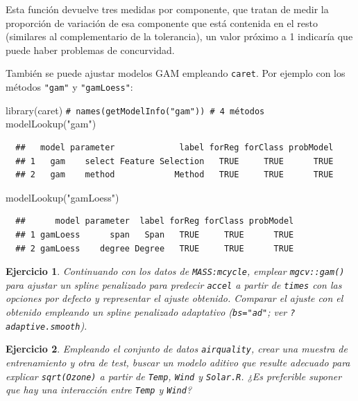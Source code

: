 \documentclass[
]{book}
\newenvironment{Shaded}{\begin{snugshade}}{\end{snugshade}}
\newcommand{\CommentTok}[1]{\textcolor[rgb]{0.56,0.35,0.01}{\textit{#1}}}
\newcommand{\FunctionTok}[1]{\textcolor[rgb]{0.00,0.00,0.00}{#1}}
\newcommand{\NormalTok}[1]{#1}
\newcommand{\StringTok}[1]{\textcolor[rgb]{0.31,0.60,0.02}{#1}}
\theoremstyle{break}
\newtheorem{exercise}{Ejercicio}[chapter]
\theoremstyle{nonumberplain}
\renewcommand{\CommentTok}[1]{\textcolor[rgb]{0.41,0.41,0.41}{\texttt{#1}}}
\begin{document}
Esta función devuelve tres medidas por componente, que tratan de medir la proporción de variación de esa componente que está contenida en el resto (similares al complementario de la tolerancia), un valor próximo a 1 indicaría que puede haber problemas de concurvidad.

También se puede ajustar modelos GAM empleando \texttt{caret}.
Por ejemplo con los métodos \texttt{"gam"} y \texttt{"gamLoess"}:

\begin{Shaded}
\begin{Highlighting}[]
\FunctionTok{library}\NormalTok{(caret)}
\CommentTok{\# names(getModelInfo("gam")) \# 4 métodos}
\FunctionTok{modelLookup}\NormalTok{(}\StringTok{"gam"}\NormalTok{)}
\end{Highlighting}
\end{Shaded}

\begin{verbatim}
  ##   model parameter             label forReg forClass probModel
  ## 1   gam    select Feature Selection   TRUE     TRUE      TRUE
  ## 2   gam    method            Method   TRUE     TRUE      TRUE
\end{verbatim}

\begin{Shaded}
\begin{Highlighting}[]
\FunctionTok{modelLookup}\NormalTok{(}\StringTok{"gamLoess"}\NormalTok{)}
\end{Highlighting}
\end{Shaded}

\begin{verbatim}
  ##      model parameter  label forReg forClass probModel
  ## 1 gamLoess      span   Span   TRUE     TRUE      TRUE
  ## 2 gamLoess    degree Degree   TRUE     TRUE      TRUE
\end{verbatim}

\begin{exercise}
\protect\hypertarget{exr:adaptive-smooth}{}\label{exr:adaptive-smooth}Continuando con los datos de \texttt{MASS:mcycle}, emplear \texttt{mgcv::gam()} para ajustar un spline penalizado para predecir \texttt{accel} a partir de \texttt{times} con las opciones por defecto y representar el ajuste obtenido. Comparar el ajuste con el obtenido empleando un spline penalizado adaptativo (\texttt{bs="ad"}; ver \texttt{?adaptive.smooth}).
\end{exercise}

\begin{exercise}
\protect\hypertarget{exr:gam-airquality}{}\label{exr:gam-airquality}Empleando el conjunto de datos \texttt{airquality}, crear una muestra de entrenamiento y otra de test, buscar un modelo aditivo que resulte adecuado para explicar \texttt{sqrt(Ozone)} a partir de \texttt{Temp}, \texttt{Wind} y \texttt{Solar.R}.
¿Es preferible suponer que hay una interacción entre \texttt{Temp} y \texttt{Wind}?
\end{exercise}
\end{document}
